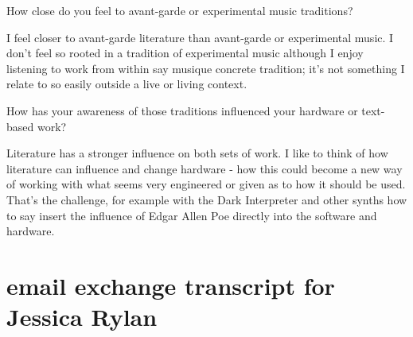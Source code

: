 How close do you feel to avant-garde or experimental music traditions? 

I feel closer to avant-garde literature than avant-garde or
experimental music. I don't feel so rooted in a tradition of
experimental music although I enjoy listening to work from within say
musique concrete tradition; it's not something I relate to so easily
outside a live or living context.

How has your awareness of those traditions influenced your hardware or
text-based work?

Literature has a stronger influence on both sets of work. I like to
think of how literature can influence and change hardware - how this
could become a new way of working with what seems very engineered or
given as to how it should be used. That's the challenge, for example
with the Dark Interpreter and other synths how to say insert the
influence of Edgar Allen Poe directly into the software and hardware.

\section{email exchange transcript for Jessica Rylan}

